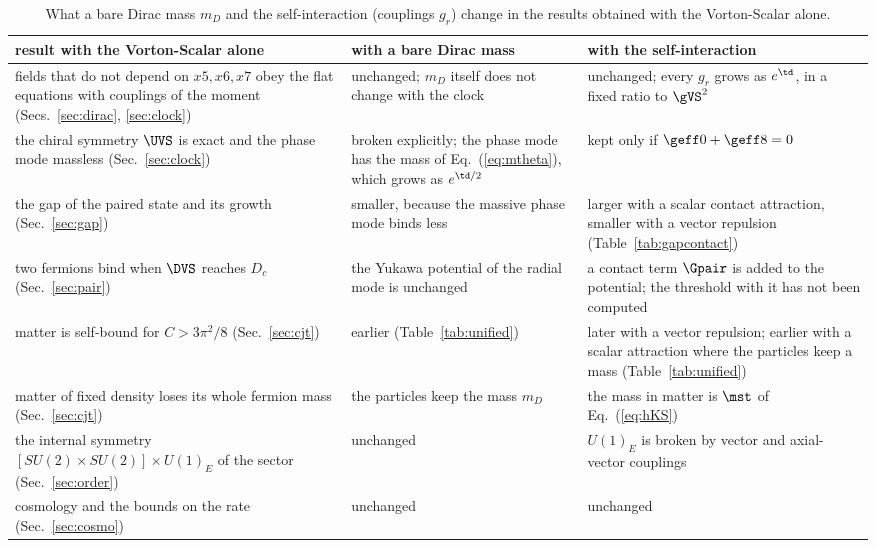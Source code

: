 \begin{table}
\caption{\label{tab:changes}What a bare Dirac mass $m_D$ and the self-interaction (couplings $g_r$)
change in the results obtained with the Vorton-Scalar alone.}
\begin{ruledtabular}
\begin{tabular}{p{}p{}p{}}
result with the Vorton-Scalar alone & with a bare Dirac mass & with the self-interaction \\
\hline
fields that do not depend on $x5,x6,x7$ obey the flat equations with couplings of the moment (Secs.~\ref{sec:dirac}, \ref{sec:clock}) & unchanged; $m_D$ itself does not change with the clock & unchanged; every $g_r$ grows as $e^{\td}$, in a fixed ratio to $\gVS^{2}$ \\
the chiral symmetry $\UVS$ is exact and the phase mode massless (Sec.~\ref{sec:clock}) & broken explicitly; the phase mode has the mass of Eq.~(\ref{eq:mtheta}), which grows as $e^{\td/2}$ & kept only if $\geff0+\geff8=0$ \\
the gap of the paired state and its growth (Sec.~\ref{sec:gap}) & smaller, because the massive phase mode binds less & larger with a scalar contact attraction, smaller with a vector repulsion (Table~\ref{tab:gapcontact}) \\
two fermions bind when $\DVS$ reaches $D_c$ (Sec.~\ref{sec:pair}) & the Yukawa potential of the radial mode is unchanged & a contact term $\Gpair$ is added to the potential; the threshold with it has not been computed \\
matter is self-bound for $C>3\pi^{2}/8$ (Sec.~\ref{sec:cjt}) & earlier (Table~\ref{tab:unified}) & later with a vector repulsion; earlier with a scalar attraction where the particles keep a mass (Table~\ref{tab:unified}) \\
matter of fixed density loses its whole fermion mass (Sec.~\ref{sec:cjt}) & the particles keep the mass $m_D$ & the mass in matter is $\mst$ of Eq.~(\ref{eq:hKS}) \\
the internal symmetry $[SU(2)\times SU(2)]\times U(1)_E$ of the sector (Sec.~\ref{sec:order}) & unchanged & $U(1)_E$ is broken by vector and axial-vector couplings \\
cosmology and the bounds on the rate (Sec.~\ref{sec:cosmo}) & unchanged & unchanged \\
\end{tabular}
\end{ruledtabular}
\end{table}

